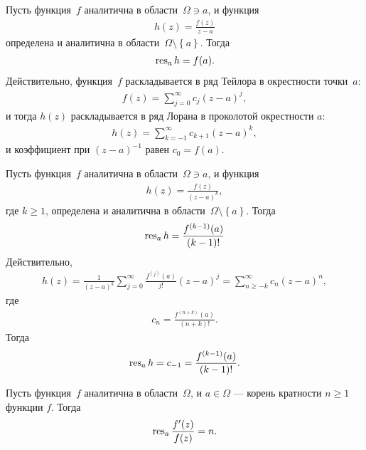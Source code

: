\documentclass[../complex-analysis.tex]{subfiles}
\begin{document}
\begin{exmpl}
 \label{example:Residue of f / z-a}
 Пусть функция~$ f $ аналитична в области~$ \Omega \ni a $, и функция
 \begin{align*}
  h(z) = \frac{f(z)}{z - a}
 \end{align*} определена и аналитична в области~$ \Omega \setminus \left\{ a \right\} $. Тогда 
 \begin{align}
  \label{eq:Residue of f / z-a}
  \operatorname{res}_a h = f(a).
 \end{align} Действительно, функция~$ f $ раскладывается в ряд Тейлора в окрестности точки~$ a $:
 \begin{align*}
  f(z) = \sum_{j=0}^{\infty} c_j (z-a)^{j},
 \end{align*} и тогда $ h(z) $ раскладывается в ряд Лорана в проколотой окрестности  $ a $:
 \begin{align*}
  h(z) = \sum_{k=-1}^{\infty} c_{k+1}(z-a)^{k},
 \end{align*} и коэффициент при $ (z-a)^{-1} $ равен $ c_{0} = f(a) $.
\end{exmpl}
\begin{exmpl}
 Пусть функция~$ f $ аналитична в области~$ \Omega \ni a $, и функция
 \begin{align*}
  h(z) = \frac{f(z)}{(z - a)^{k}},
 \end{align*} где $ k \geqslant 1 $, определена и аналитична в области~$ \Omega \setminus \left\{ a \right\} $. Тогда 
 \begin{align*}
  \operatorname{res}_a h = \frac{f^{(k-1)}(a)}{(k-1)!}
 \end{align*} Действительно,
 \begin{align*}
  h(z) = \frac{1}{(z-a)^{k}}\sum_{j=0}^{\infty} \frac{f^{(j)}(a)}{j!}(z-a)^{j} = \sum_{n \geqslant -k}^{\infty} c_n(z-a)^{n},
 \end{align*} где
 \begin{align*}
  c_n = \frac{f^{(n+k)}(a)}{(n+k)!}.
 \end{align*} Тогда
 \begin{align*}
  \operatorname{res}_a h = c_{-1} = \frac{f^{(k-1)}(a)}{(k-1)!}.
 \end{align*}
\end{exmpl}
\begin{exmpl}
 \label{example:logarithmic_derivative1}
 Пусть функция~$ f $ аналитична в области~$ \Omega $, и $ a \in \Omega $ --- корень кратности $ n \geqslant 1 $ функции $ f $. Тогда
 \begin{align*}
  \operatorname{res}_a \frac{f'(z)}{f(z)} = n.
 \end{align*}
\end{exmpl}
\end{document}
